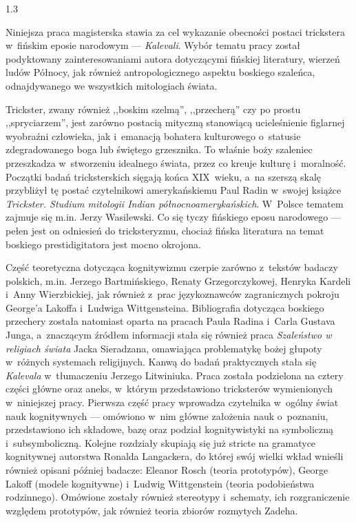 \documentclass[11pt,a4paper,twoside]{report}
\begin{document}
\begin{spacing}{1.3}

Niniejsza praca magisterska stawia za cel wykazanie obecności postaci trickstera w~fińskim eposie narodowym --- \emph{Kalevali}. Wybór tematu pracy został podyktowany zainteresowaniami autora dotyczącymi fińskiej literatury, wierzeń ludów Północy, jak również antropologicznego aspektu boskiego szaleńca, odnajdywanego we wszystkich mitologiach świata.

Trickster, zwany również ,,boskim szelmą'', ,,przecherą'' czy po prostu ,,spryciarzem'', jest zarówno postacią mityczną stanowiącą ucieleśnienie figlarnej wyobraźni człowieka, jak i~emanacją bohatera kulturowego o~statusie zdegradowanego boga lub świętego grzesznika. To właśnie boży szaleniec przeszkadza w~stworzeniu idealnego świata, przez co kreuje kulturę i~moralność. Początki badań tricksterskich sięgają końca XIX~wieku, a~na szerszą skalę przybliżył tę postać czytelnikowi amerykańskiemu Paul Radin w~swojej książce \emph{Trickster. Studium mitologii Indian północnoamerykańskich}. W~Polsce tematem zajmuje się m.in. Jerzy Wasilewski. Co się tyczy fińskiego eposu narodowego --- pełen jest on odniesień do tricksteryzmu, chociaż fińska literatura na temat boskiego prestidigitatora jest mocno okrojona.

Część teoretyczna dotycząca kognitywizmu czerpie zarówno z~tekstów badaczy polskich, m.in. Jerzego Bartmińskiego, Renaty Grzegorczykowej, Henryka Kardeli i~Anny Wierzbickiej, jak również z~prac językoznawców zagranicznych pokroju George’a Lakoffa i~Ludwiga Wittgensteina. Bibliografia dotycząca boskiego przechery została natomiast oparta na pracach Paula Radina i~Carla Gustava Junga, a~znaczącym źródłem informacji stała się również praca \emph{Szaleństwo w religiach świata} Jacka Sieradzana, omawiająca problematykę bożej głupoty w~różnych systemach religijnych. Kanwą do badań praktycznych stała się \emph{Kalevala} w~tłumaczeniu Jerzego Litwiniuka. Praca została podzielona na cztery części główne oraz aneks, w~którym przedstawiono tricksterów wymienionych w~niniejszej pracy.
\newpage
\vspace*{1.5\baselineskip}
Pierwsza część pracy wprowadza czytelnika w~ogólny świat nauk kognitywnych --- omówiono w~nim główne założenia nauk o~poznaniu, przedstawiono ich składowe, bazę oraz podział kognitywistyki na symboliczną i~subsymboliczną. Kolejne rozdziały skupiają się już stricte na gramatyce kognitywnej autorstwa Ronalda Langackera, do której swój wielki wkład wnieśli również opisani później badacze: Eleanor Rosch (teoria prototypów), George Lakoff (modele kognitywne) i~Ludwig Wittgenstein (teoria podobieństwa rodzinnego). Omówione zostały również stereotypy i~schematy, ich rozgraniczenie względem prototypów, jak również teoria zbiorów rozmytych Zadeha.


\end{spacing}
\end{document}
